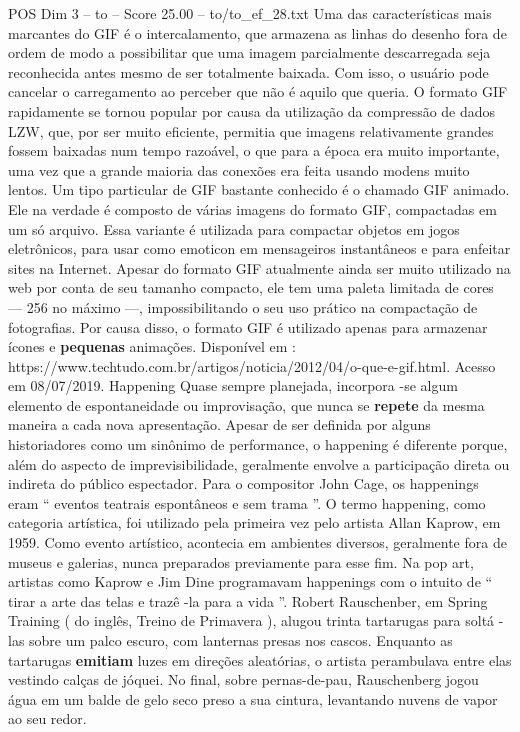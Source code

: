 \begin{textsample}{POS Dim 3 – to – Score 25.00 – to/to\_ef\_28.txt}
Uma das características mais marcantes do GIF é o intercalamento, que armazena as linhas do desenho fora de ordem de modo a possibilitar que uma imagem parcialmente descarregada seja reconhecida antes mesmo de ser totalmente baixada.
Com isso, o usuário pode cancelar o carregamento ao perceber que não é aquilo que queria.
O formato GIF rapidamente se tornou popular por causa da utilização da compressão de dados LZW, que, por ser muito eficiente, permitia que imagens relativamente grandes fossem baixadas num tempo razoável, o que para a época era muito importante, uma vez que a grande maioria das conexões era feita usando modens muito lentos.
Um tipo particular de GIF bastante conhecido é o chamado GIF animado.
Ele na verdade é composto de várias imagens do formato GIF, compactadas em um só arquivo.
Essa variante é utilizada para compactar objetos em jogos eletrônicos, para usar como emoticon em mensageiros instantâneos e para enfeitar sites na Internet.
Apesar do formato GIF atualmente ainda ser muito utilizado na web por conta de seu tamanho compacto, ele tem uma paleta limitada de cores — 256 no máximo —, impossibilitando o seu uso prático na compactação de fotografias.
Por causa disso, o formato GIF é utilizado apenas para armazenar ícones e \textbf{pequenas} animações.
Disponível em : https://www.techtudo.com.br/artigos/noticia/2012/04/o-que-e-gif.html.
Acesso em 08/07/2019.
Happening Quase sempre planejada, incorpora -se algum elemento de espontaneidade ou improvisação, que nunca se \textbf{repete} da mesma maneira a cada nova apresentação.
Apesar de ser definida por alguns historiadores como um sinônimo de performance, o happening é diferente porque, além do aspecto de imprevisibilidade, geralmente envolve a participação direta ou indireta do público espectador.
Para o compositor John Cage, os happenings eram “ eventos teatrais espontâneos e sem trama ”.
O termo happening, como categoria artística, foi utilizado pela primeira vez pelo artista Allan Kaprow, em 1959.
Como evento artístico, acontecia em ambientes diversos, geralmente fora de museus e galerias, nunca preparados previamente para esse fim.
Na pop art, artistas como Kaprow e Jim Dine programavam happenings com o intuito de “ tirar a arte das telas e trazê -la para a vida ”.
Robert Rauschenber, em Spring Training ( do inglês, Treino de Primavera ), alugou trinta tartarugas para soltá -las sobre um palco escuro, com lanternas presas nos cascos.
Enquanto as tartarugas \textbf{emitiam} luzes em direções aleatórias, o artista perambulava entre elas vestindo calças de jóquei.
No final, sobre pernas-de-pau, Rauschenberg jogou água em um balde de gelo seco preso a sua cintura, levantando nuvens de vapor ao seu redor.

\end{textsample}
